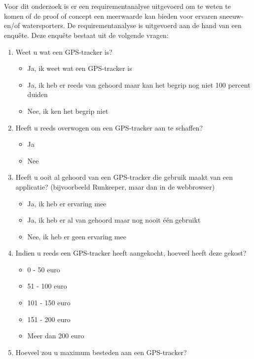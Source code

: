 \section{}
\label{ch:requirementAnalyse}
Voor dit onderzoek is er een requirementanalyse uitgevoerd om te weten te komen of de proof of concept een meerwaarde kan bieden voor ervaren sneeuw- en/of watersporters. De requirementanalyse is uitgevoerd aan de hand van een enquête. Deze enquête bestaat uit de volgende vragen:
\begin{enumerate}
	\item Weet u wat een GPS-tracker is?
		\begin{itemize}
			\item Ja, ik weet wat een GPS-tracker is
			\item Ja, ik heb er reeds van gehoord maar kan het begrip nog niet 100 percent duiden
			\item Nee, ik ken het begrip niet
		\end{itemize}
	\item Heeft u reeds overwogen om een GPS-tracker aan te schaffen?
		\begin{itemize}
			\item Ja
			\item Nee
		\end{itemize}
	\item Heeft u ooit al gehoord van een GPS-tracker die gebruik maakt van een applicatie? (bijvoorbeeld Runkeeper, maar dan in de webbrowser)
		\begin{itemize}
			\item Ja, ik heb er ervaring mee
			\item Ja, ik heb er al van gehoord maar nog nooit één gebruikt
			\item Nee, ik heb er geen ervaring mee
		\end{itemize}
	\item Indien u reeds een GPS-tracker heeft aangekocht, hoeveel heeft deze gekost?
		\begin{itemize}
			\item 0 - 50 euro
			\item 51 - 100 euro
			\item 101 - 150 euro
			\item 151 - 200 euro
			\item Meer dan 200 euro
		\end{itemize}
	\item Hoeveel zou u maximum besteden aan een GPS-tracker?

\end{enumerate}
